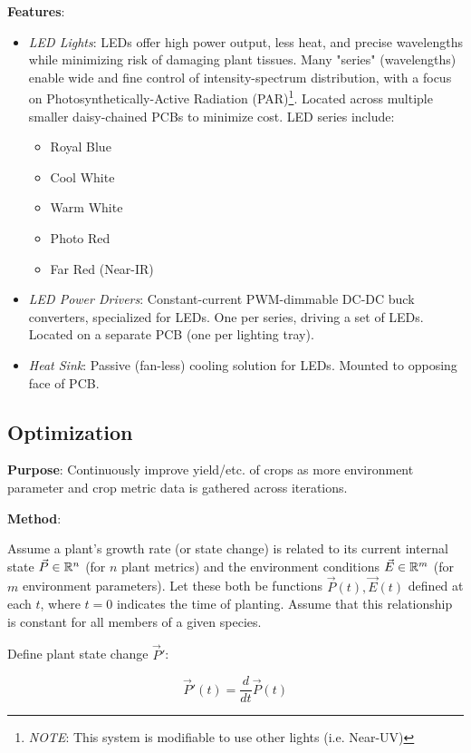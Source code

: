 \documentclass{report}
\begin{document}
\textbf{Features}:
\begin{itemize}
    \item \textit{LED Lights}: LEDs offer high power output, less heat, and precise wavelengths while minimizing risk of damaging plant tissues. Many "series" (wavelengths) enable wide and fine control of intensity-spectrum distribution, with a focus on Photosynthetically-Active Radiation (PAR)\footnote{\textit{NOTE}: This system is modifiable to use other lights (i.e. Near-UV)}. Located across multiple smaller daisy-chained PCBs to minimize cost. LED series include:
    \begin{itemize}
        \item Royal Blue
        \item Cool White
        \item Warm White
        \item Photo Red
        \item Far Red (Near-IR)
    \end{itemize}
    \item \textit{LED Power Drivers}: Constant-current PWM-dimmable DC-DC buck converters, specialized for LEDs. One per series, driving a set of LEDs. Located on a separate PCB (one per lighting tray).
    \item \textit{Heat Sink}: Passive (fan-less) cooling solution for LEDs. Mounted to opposing face of PCB.
\end{itemize}

\newpage

\subsection{Optimization}
\label{sec:optimization}

\textbf{Purpose}: Continuously improve yield/etc. of crops as more environment parameter and crop metric data is gathered across iterations.

\textbf{Method}: 

Assume a plant's growth rate (or state change) is related to its current internal state $\vec P \in \mathbb R^n$ (for $n$ plant metrics) and the environment conditions $\vec E \in \mathbb R^m$ (for $m$ environment parameters). Let these both be functions $\vec P (t),\vec E(t)$ defined at each $t$, where $t=0$ indicates the time of planting. Assume that this relationship is constant for all members of a given species.

Define plant state change $\vec P'$: 

$$\vec P'(t) = \frac{d}{dt}\vec P(t)$$
\end{document}
